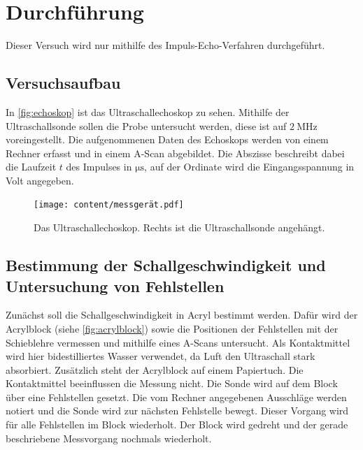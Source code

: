\section{Durchführung}
\label{sec:Durchführung}

Dieser Versuch wird nur mithilfe des Impuls-Echo-Verfahren durchgeführt.

\subsection{Versuchsaufbau}
\label{subsec:versuchsaufbau}
In \autoref{fig:echoskop} ist das Ultraschallechoskop zu sehen.
Mithilfe der Ultraschallsonde sollen die Probe untersucht werden, diese ist auf $\SI{2}{\mega\hertz}$ voreingestellt.
Die aufgenommenen Daten des Echoskops werden von einem Rechner erfasst und in einem A-Scan abgebildet.
Die Abszisse beschreibt dabei die Laufzeit $t$ des Impulses in $\si{\micro\second}$, auf der Ordinate wird die Eingangsspannung in Volt angegeben.

\begin{figure}
    \centering
    \texttt{[image: content/messgerät.pdf]}
    \caption{Das Ultraschallechoskop. Rechts ist die Ultraschallsonde angehängt.}
    \label{fig:echoskop}
\end{figure}

\subsection{Bestimmung der Schallgeschwindigkeit und Untersuchung von Fehlstellen}
\label{aufgabe_1}
Zunächst soll die Schallgeschwindigkeit in Acryl bestimmt werden.
Dafür wird der Acrylblock (siehe \autoref{fig:acrylblock}) sowie die Positionen der Fehlstellen mit der Schieblehre vermessen und mithilfe eines A-Scans untersucht.
Als Kontaktmittel wird hier bidestilliertes Wasser verwendet, da Luft den Ultraschall stark absorbiert.
Zusätzlich steht der Acrylblock auf einem Papiertuch.
Die Kontaktmittel beeinflussen die Messung nicht.
Die Sonde wird auf dem Block über eine Fehlstellen gesetzt.
Die vom Rechner angegebenen Ausschläge werden notiert und die Sonde wird zur nächsten Fehlstelle bewegt.
Dieser Vorgang wird für alle Fehlstellen im Block wiederholt.
Der Block wird gedreht und der gerade beschriebene Messvorgang nochmals wiederholt.

